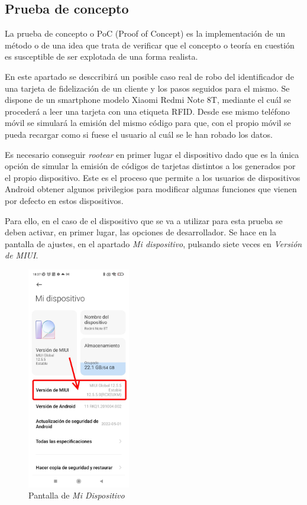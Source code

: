 \documentclass[12pt,a4paper,onecolumn,oneside]{report}
\begin{document}
\subsection{Prueba de concepto}

La prueba de concepto o PoC (Proof of Concept) es la implementación de un método o de una idea que trata de verificar que el concepto o teoría en cuestión es susceptible de ser explotada de una forma realista.

En este apartado se desccribirá un posible caso real de robo del identificador de una tarjeta de fidelización de un cliente y los pasos seguidos para el mismo. Se dispone de un smartphone modelo Xiaomi Redmi Note 8T, mediante el cuál se procederá a leer una tarjeta con una etiqueta RFID. Desde ese mismo teléfono móvil se simulará la emisión del mismo código para que, con el propio móvil se pueda recargar como si fuese el usuario al cuál se le han robado los datos.

Es necesario conseguir \textit{rootear} en primer lugar el dispositivo dado que es la única opción de simular la emisión de códigos de tarjetas distintos a los generados por el propio dispositivo. Este es el proceso que permite a los usuarios de dispositivos Android obtener algunos privilegios para modificar algunas funciones que vienen por defecto en estos dispositivos.

Para ello, en el caso de el dispositivo que se va a utilizar para esta prueba se deben activar, en primer lugar, las opciones de desarrollador. Se hace en la pantalla de ajustes, en el apartado \textit{Mi dispositivo}, pulsando siete veces en \textit{Versión de MIUI}.


\begin{figure}[H] 
\centering
  \includegraphics[width=0.4\textwidth]{figuras/root1.png}
  \caption[Pantalla de \textit{Mi Dispositivo}]{Pantalla de \textit{Mi Dispositivo}\\
  }
  \label{fig:root1}
\end{figure}
\end{document}
